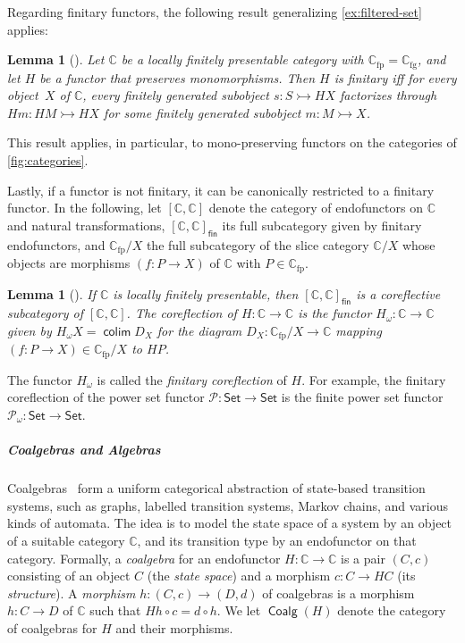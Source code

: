\documentclass[10pt,a4paper]{article}
\newtheorem{lemma}[theorem]{Lemma}
\theoremstyle{definition}
\theoremstyle{remark}
\numberwithin{equation}{section}
\providecommand{\catname}{\mathsf}
\def\Set{\catname{Set}}
\newcommand{\lfplong}{locally finitely presentable\xspace}
\newcommand{\lfp}{\lfplong}
\newcommand{\Pow}{\mathcal{P}}
\DeclareMathOperator{\colim}{\mathsf{colim}}
\newcommand{\Powf}{\mathcal{P}_{\omega}}
\providecommand{\C}{}
\newcommand{\fp}{{\mathrm{fp}}}
\newcommand{\fg}{{\mathrm{fg}}}
\renewcommand{\C}{{\mathbb{C}}}
\DeclareMathOperator{\Coalg}{\mathsf{Coalg}}
\newcommand{\monoto}{\rightarrowtail}
\newcommand{\resetCurThmBraces}{  \gdef\curThmBraceOpen{(}  \gdef\curThmBraceClose{)}}
\newcommand{\removeThmBraces}{  \gdef\curThmBraceOpen{}  \gdef\curThmBraceClose{}}
\newenvironment{notheorembrackets}{\removeThmBraces}{\resetCurThmBraces}
\theoremstyle{plain}
\theoremstyle{definition}
\begin{document}
Regarding finitary functors, the following result generalizing \autoref{ex:filtered-set} applies:

\begin{notheorembrackets}
\begin{lemma}[{\cite[Thm.~3.4]{amsw19}}]\label{lem:finitary-criterion}
Let $\C$ be a \lfp category with $\C_\fp = \C_\fg$, and let $H$ be a functor that preserves monomorphisms. Then $H$ is finitary iff for every object~$X$ of $\C$, every finitely generated subobject $s\colon S\monoto HX$ factorizes through $Hm\colon HM\monoto HX$ for some finitely generated subobject $m\colon M\monoto X$.  
\end{lemma}
\end{notheorembrackets}
This result applies, in particular, to mono-preserving functors on the categories of \autoref{fig:categories}.

Lastly, if a functor is not finitary, it can be canonically restricted to a finitary functor. In the following, let $[\C,\C]$ denote the category of endofunctors on $\C$ and natural transformations, $[\C,\C]_{\mathsf{fin}}$ its full subcategory given by finitary endofunctors, and $\C_\fp/X$ the full subcategory of the slice category $\C/X$ whose objects are morphisms $(f\colon P\to X)$ of $\C$ with $P\in \C_\fp$.

\begin{notheorembrackets}
\begin{lemma}[{\cite[Cor.~2.8]{amv03}}]\label{lem:finitary-coreflection}
If $\C$ is \lfp, then $[\C,\C]_{\mathsf{fin}}$ is a coreflective subcategory of $[\C,\C]$. The coreflection of $H\colon \C\to \C$ is the functor $H_\omega\colon \C\to\C$ given by $H_\omega X=\colim D_X$ for the diagram $D_X\colon \C_\fp/X\to \C$ mapping $(f\colon P\to X)\in \C_\fp/X$ to $HP$.   
\end{lemma}
\end{notheorembrackets}
The functor $H_\omega$ is called the \emph{finitary coreflection} of $H$. For example, the finitary coreflection of the power set functor $\Pow\colon \Set\to \Set$ is the finite power set functor $\Powf\colon \Set\to \Set$.

\subparagraph*{Coalgebras and Algebras} 

Coalgebras~\cite{jacobs16,rutten00} form a uniform categorical abstraction of state-based transition systems, such as graphs, labelled transition systems, Markov chains, and various kinds of automata. The idea is to model the state space of a system by an object of a suitable category $\C$, and its transition type by an endofunctor on that category. Formally, a \emph{coalgebra} for an endofunctor $H\colon \C\to \C$ is a pair $(C,c)$ consisting of an object $C$ (the
\emph{state space}) and a morphism $c\colon C\to HC$ (its
\emph{structure}). A \emph{morphism} $h\colon (C,c)\to (D,d)$ of coalgebras is a morphism $h\colon C\to D$ of $\C$ such that $Hh\circ c = d\circ h$. We let $\Coalg(H)$ denote the category of coalgebras for $H$ and their morphisms. 
\end{document}
